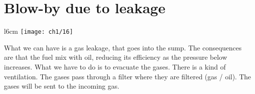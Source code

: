 \section{Blow-by due to leakage}
			\begin{wrapfigure}[13]{l}{6cm}
			\vspace{-5mm}
			\texttt{[image: ch1/16]}
			\end{wrapfigure}
			What we can have is a gas leakage, that goes into the sump. The consequences are that the fuel mix with oil, reducing its efficiency as the pressure below increases. What we have to do is to evacuate the gases. There is a kind of ventilation. The gases pass through a filter where they are filtered (gas / oil). The gases will be sent to the incoming gas. 
